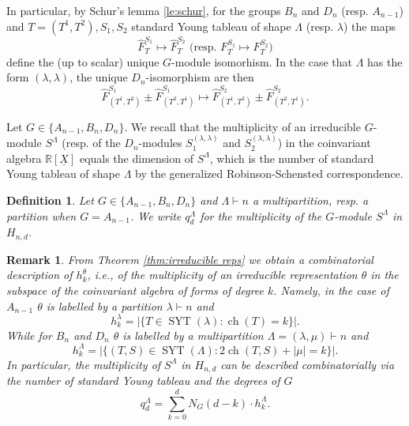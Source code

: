 \documentclass[11pt,a4paper]{amsart}
\numberwithin{equation}{section}
\newtheorem{definition}[thm]{Definition}
\newtheorem{remark}[thm]{Remark}
\theoremstyle{definition}
\newcommand{\R}{\mathbb{R}}
\DeclareMathOperator{\ch}{ch}
\DeclareMathOperator{\SYT}{SYT}
\numberwithin{thm}{section}
\theoremstyle{break}
\numberwithin{subcase}{case}
\begin{document}
In particular, by Schur's lemma \ref{le:schur}, for the groups $B_n$ and $D_n$ (resp. $A_{n-1}$) and $T=(T^1,T^2),S_1,S_2$ standard Young tableau of shape $\Lambda$ (resp. $\lambda$) the maps $$ \widehat{F}_T^{S_1}\mapsto \widehat{F}_T^{S_2} \text{ (resp. } {F}_T^{S_1}\mapsto F_T^{S_2})$$ define the (up to scalar) unique $G$-module isomorhism. In the case that $\Lambda$ has the form $(\lambda, \lambda)$, the unique $D_n$-isomorphism are then $$\widehat{F}_{(T^1,T^2)}^{S_1}\pm \widehat{F}_{(T^2,T^1)}^{S_1} \mapsto \widehat{F}_{(T^1,T^2)}^{S_2}\pm\widehat{F}_{(T^2,T^1)}^{S_2}.$$

Let $G \in \{A_{n-1},B_{n},D_n\}$. We recall that the multiplicity of an irreducible $G$-module $S^{\Lambda}$ (resp. of the $D_n$-modules $S^{(\lambda,\lambda)}_1$ and $S^{(\lambda,\lambda)}_2$) in the coinvariant algebra $\R[\underline{X}]$ equals the dimension of $S^{\Lambda}$, which is the number of standard Young tableau of shape $\Lambda$ by the generalized Robinson-Schensted correspondence.

\begin{definition}
Let $G \in \{A_{n-1},B_n,D_n\}$ and $\Lambda \vdash n$ a multipartition, resp. a partition when $G=A_{n-1}$. We write $q_d^\Lambda$ for the multiplicity of the $G$-module $S^\Lambda$ in $H_{n,d}$.
\end{definition}

\begin{remark}
From Theorem \ref{thm:irreducible reps} we obtain a combinatorial description of $h_k^\theta$, i.e., of the multiplicity of an irreducible representation $\theta$ in the subspace of the coinvariant algebra of forms of degree $k$. Namely, in the case of $A_{n-1}$ $\theta$ is labelled by a partition $\lambda \vdash n$ and $$h_k^{\lambda} = |\{ T \in \SYT (\lambda) : \ch (T) = k \}|. $$ While for $B_n$ and $D_n$ $\theta$ is labelled by a multipartition $\Lambda = (\lambda,\mu) \vdash n$ and $$h_k^\Lambda = |\{ (T,S) \in \SYT (\Lambda) : 2\ch (T,S) + |\mu|=k\}|.$$
In particular, the multiplicity of $S^{\Lambda}$ in $H_{n,d}$ can be described combinatorially via the number of standard Young tableau and the degrees of $G$ $$q_d^\Lambda = \sum_{k=0}^dN_G(d-k) \cdot h_k^\Lambda.$$
\end{remark}
\end{document}
